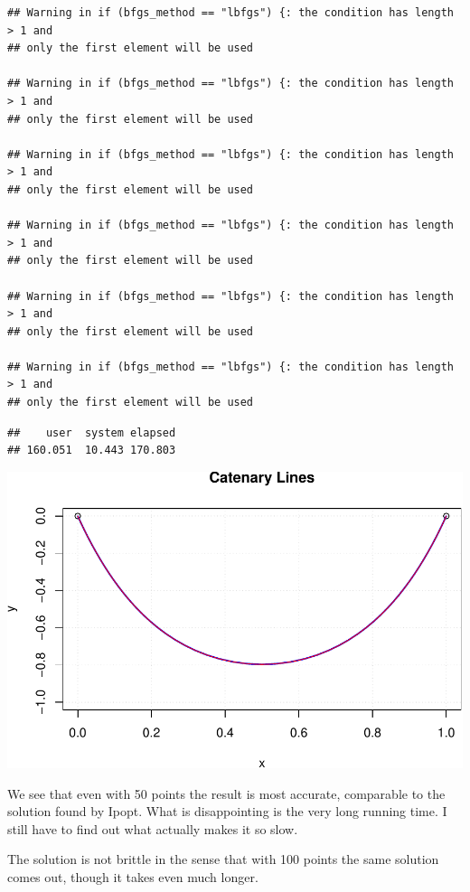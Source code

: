 \documentclass[]{article}
\begin{document}
\begin{verbatim}
## Warning in if (bfgs_method == "lbfgs") {: the condition has length > 1 and
## only the first element will be used

## Warning in if (bfgs_method == "lbfgs") {: the condition has length > 1 and
## only the first element will be used

## Warning in if (bfgs_method == "lbfgs") {: the condition has length > 1 and
## only the first element will be used

## Warning in if (bfgs_method == "lbfgs") {: the condition has length > 1 and
## only the first element will be used

## Warning in if (bfgs_method == "lbfgs") {: the condition has length > 1 and
## only the first element will be used

## Warning in if (bfgs_method == "lbfgs") {: the condition has length > 1 and
## only the first element will be used
\end{verbatim}

\begin{verbatim}
##    user  system elapsed 
## 160.051  10.443 170.803
\end{verbatim}

\includegraphics{catenary_files/figure-latex/unnamed-chunk-12-1.pdf}

We see that even with 50 points the result is most accurate, comparable
to the solution found by Ipopt. What is disappointing is the very long
running time. I still have to find out what actually makes it so slow.

The solution is not brittle in the sense that with 100 points the same
solution comes out, though it takes even much longer.
\end{document}
